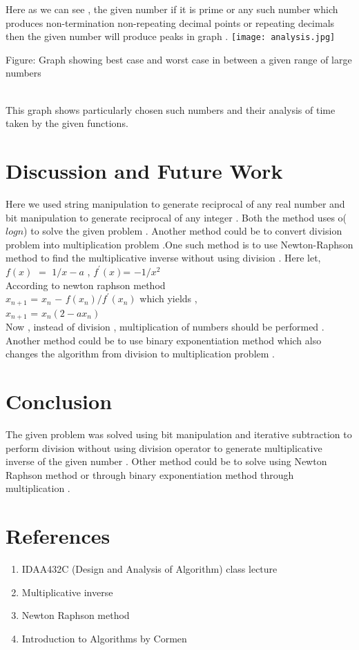 \documentclass[twocolumn]{article}      %
\begin{document}
Here as we can see , the given number if it is  prime or any such number which produces non-termination non-repeating decimal points or repeating decimals then the given number will produce peaks in graph .
\texttt{[image: analysis.jpg]}
\caption{Figure: Graph showing best case and worst case in between a given range of large numbers}\\
This graph shows particularly chosen such numbers and their analysis of time taken by the given functions.
\section{Discussion and Future Work}
Here we used string manipulation to generate reciprocal of any real number and bit manipulation to generate reciprocal of any integer . Both the method uses o($logn$) to solve the given problem . 
Another method could be to convert division problem into multiplication problem .One such method is to use Newton-Raphson method to find the multiplicative inverse without using division . Here let,\\ $f(x)$ $=$ $1/x-a$ , $f^\prime(x)$= $ -1/x^2$ \\
According to newton raphson method \\
$x_{n+1}$ = $x_n$ $-$ $f(x_n)/f^\prime(x_n)$
which yields ,\\ $x_{n+1}$ = $x_n(2-ax_n)$\\
Now , instead of division , multiplication of numbers should be performed .
Another method could be to use binary exponentiation method which also changes the algorithm from division to multiplication problem .
\section{Conclusion}
The given problem was solved using bit manipulation and iterative subtraction to perform division without using division operator to generate multiplicative inverse of the given number . Other method could be to solve using Newton Raphson method or through binary exponentiation method through multiplication .
\section{References}
\begin{enumerate}
\item IDAA432C (Design and Analysis of Algorithm) class lecture
\item Multiplicative inverse
\item Newton Raphson method
\item Introduction to Algorithms by Cormen
\end{enumerate}
\end{document}
